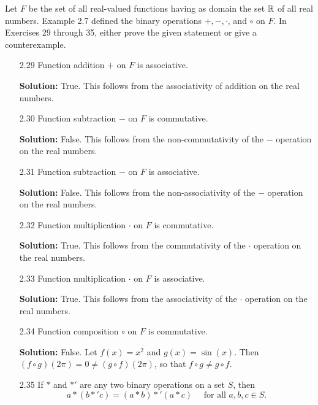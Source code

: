 \noindent Let $F$ be the set of all real-valued functions having as domain the
          set $\mathbb{R}$ of all real numbers. Example 2.7 defined the binary 
          operations $+, -, \cdot$, and $\circ$ on $F$. In Exercises 29 through
          35, either prove the given statement or give a counterexample.

\begin{enumerate}
   \item[2.29] Function addition $+$ on $F$ is associative.

      \textbf{Solution:} True. This follows from the associativity of addition 
      on the real numbers.
   \item[2.30] Function subtraction $-$ on $F$ is commutative.

      \textbf{Solution:} False. This follows from the non-commutativity of the
      $-$ operation on the real numbers.
   \item[2.31] Function subtraction $-$ on $F$ is associative.

      \textbf{Solution:} False. This follows from the non-associativity of the
      $-$ operation on the real numbers.
   \item[2.32] Function multiplication $\cdot$ on $F$ is commutative.

      \textbf{Solution:} True. This follows from the commutativity of the
      $\cdot$ operation on the real numbers.
   \item[2.33] Function multiplication $\cdot$ on $F$ is associative.

      \textbf{Solution:} True. This follows from the associativity of the
      $\cdot$ operation on the real numbers.
   \item[2.34] Function composition $\circ$ on $F$ is commutative.

      \textbf{Solution:} False. Let $f(x) = x^2$ and $g(x) = \sin(x)$. Then
      $(f \circ g)(2\pi) = 0 \neq (g \circ f)(2\pi)$, so that
      $f \circ g \neq g \circ f$.
   \item[2.35] If $*$ and $*'$ are any two binary operations on a set $S$, then
               $$a * (b *' c) = (a * b) *' (a * c) \quad \mbox{ for all }
                 a, b, c \in S.$$


\end{enumerate}
